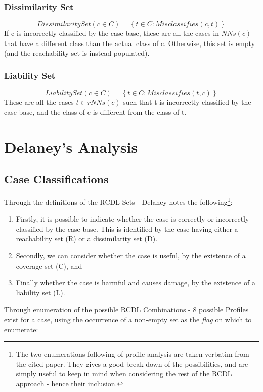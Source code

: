 \documentclass[a4paper,11pt]{report}
\begin{document}
\subsubsection{Dissimilarity Set}
\[ DissimilaritySet(c \in C) = \left\lbrace t \in C : Misclassifies(c, t) \right\rbrace \]  
If c is incorrectly classified by the case base, these are all the cases in $ NNs(c) $ that have a different class than the actual class of c. Otherwise, this set is empty (and the reachability set is instead populated).

\subsubsection{Liability Set}
\[ LiabilitySet(c \in C) = \left\lbrace t \in C : Misclassifies(t, c) \right\rbrace \]  
These are all the cases $ t \in rNNs(c) $ such that t is incorrectly classified by the case base, and the class of c is different from the class of t.

\section{Delaney's Analysis}

\subsection{Case Classifications}
Through the definitions of the RCDL Sets - Delaney notes the following\cite{Delany2009}\footnote{The two enumerations following of profile analysis are taken verbatim from the cited paper. They gives a good break-down of the possibilities, and are simply useful to keep in mind when considering the rest of the RCDL approach - hence their inclusion.}:

\begin{enumerate}
	\item Firstly, it is possible to indicate whether the case is correctly or incorrectly classified by the case-base. This is identified by the case having either a reachability set (R) or a dissimilarity set (D).
	\item Secondly, we can consider whether the case is useful, by the existence of a coverage set (C), and
	\item Finally whether the case is harmful and causes damage, by the existence of a liability set (L).
\end{enumerate}

Through enumeration of the possible RCDL Combinations - 8 possible Profiles exist for a case, using the occurrence of a non-empty set as the \emph{flag} on which to enumerate\cite{Delany2009}:
\end{document}
